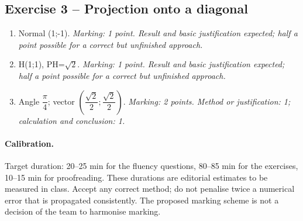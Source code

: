 \subsection*{Exercise 3 -- Projection onto a diagonal}
\begin{enumerate}
\item Normal (1;-1). \textit{Marking: 1 point. Result and basic justification expected; half a point possible for a correct but unfinished approach.}
\item H(1;1), PH=$\sqrt2$. \textit{Marking: 1 point. Result and basic justification expected; half a point possible for a correct but unfinished approach.}
\item Angle $\dfrac{\pi}{4}$; vector $(\dfrac{\sqrt 2}{2};\dfrac{\sqrt 2}{2})$. \textit{Marking: 2 points. Method or justification: 1; calculation and conclusion: 1.}
\end{enumerate}
\paragraph{Calibration.} Target duration: 20--25 min for the fluency questions, 80--85 min for the exercises, 10--15 min for proofreading. These durations are editorial estimates to be measured in class. Accept any correct method; do not penalise twice a numerical error that is propagated consistently. The proposed marking scheme is not a decision of the team to harmonise marking.
